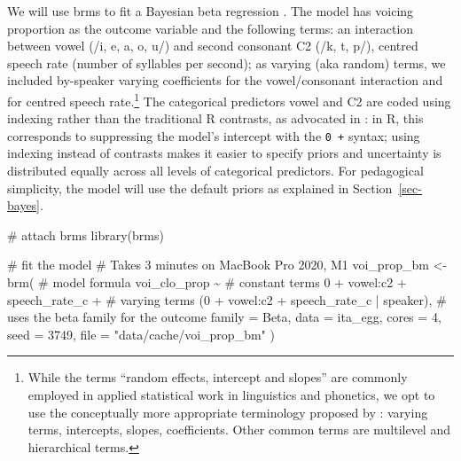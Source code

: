 \documentclass[
  authoryear,
  preprint,
  3p]{elsarticle}
\newenvironment{Shaded}{\begin{snugshade}}{\end{snugshade}}
\newcommand{\AttributeTok}[1]{\textcolor[rgb]{0.40,0.45,0.13}{#1}}
\newcommand{\CommentTok}[1]{\textcolor[rgb]{0.37,0.37,0.37}{#1}}
\newcommand{\DecValTok}[1]{\textcolor[rgb]{0.68,0.00,0.00}{#1}}
\newcommand{\FunctionTok}[1]{\textcolor[rgb]{0.28,0.35,0.67}{#1}}
\newcommand{\NormalTok}[1]{\textcolor[rgb]{0.00,0.23,0.31}{#1}}
\newcommand{\OtherTok}[1]{\textcolor[rgb]{0.00,0.23,0.31}{#1}}
\newcommand{\SpecialCharTok}[1]{\textcolor[rgb]{0.37,0.37,0.37}{#1}}
\newcommand{\StringTok}[1]{\textcolor[rgb]{0.13,0.47,0.30}{#1}}
\begin{document}
We will use brms to fit a Bayesian beta regression \citep{burkner2017}.
The model has voicing proportion as the outcome variable and the
following terms: an interaction between vowel (/i, e, a, o, u/) and
second consonant C2 (/k, t, p/), centred speech rate (number of
syllables per second); as varying (aka random) terms, we included
by-speaker varying coefficients for the vowel/consonant interaction and
for centred speech rate.\footnote{While the terms ``random effects,
  intercept and slopes'' are commonly employed in applied statistical
  work in linguistics and phonetics, we opt to use the conceptually more
  appropriate terminology proposed by \citet{gelman2005}: varying terms,
  intercepts, slopes, coefficients. Other common terms are multilevel
  and hierarchical terms.} The categorical predictors vowel and C2 are
coded using indexing rather than the traditional R contrasts, as
advocated in \citet{mcelreath2019}: in R, this corresponds to
suppressing the model's intercept with the \texttt{0\ +} syntax; using
indexing instead of contrasts makes it easier to specify priors and
uncertainty is distributed equally across all levels of categorical
predictors. For pedagogical simplicity, the model will use the default
priors as explained in Section~\ref{sec-bayes}.

\begin{Shaded}
\begin{Highlighting}[]
\CommentTok{\# attach brms}
\FunctionTok{library}\NormalTok{(brms)}

\CommentTok{\# fit the model}
\CommentTok{\# Takes 3 minutes on MacBook Pro 2020, M1}
\NormalTok{voi\_prop\_bm }\OtherTok{\textless{}{-}} \FunctionTok{brm}\NormalTok{(}
  \CommentTok{\# model formula}
\NormalTok{  voi\_clo\_prop }\SpecialCharTok{\textasciitilde{}}
    \CommentTok{\# constant terms}
    \DecValTok{0} \SpecialCharTok{+}\NormalTok{ vowel}\SpecialCharTok{:}\NormalTok{c2 }\SpecialCharTok{+}\NormalTok{ speech\_rate\_c }\SpecialCharTok{+}
    \CommentTok{\# varying terms}
\NormalTok{    (}\DecValTok{0} \SpecialCharTok{+}\NormalTok{ vowel}\SpecialCharTok{:}\NormalTok{c2 }\SpecialCharTok{+}\NormalTok{ speech\_rate\_c }\SpecialCharTok{|}\NormalTok{ speaker),}
  \CommentTok{\# uses the beta family for the outcome}
  \AttributeTok{family =}\NormalTok{ Beta,}
  \AttributeTok{data =}\NormalTok{ ita\_egg,}
  \AttributeTok{cores =} \DecValTok{4}\NormalTok{,}
  \AttributeTok{seed =} \DecValTok{3749}\NormalTok{,}
  \AttributeTok{file =} \StringTok{"data/cache/voi\_prop\_bm"}
\NormalTok{)}
\end{Highlighting}
\end{Shaded}
\end{document}
